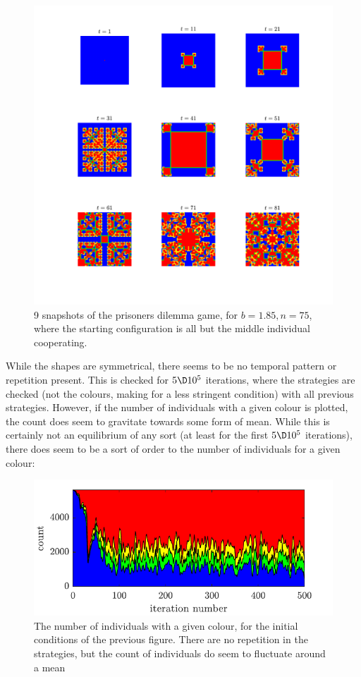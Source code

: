 \documentclass[a4paper,10pt]{article} 	%
\numberwithin{equation}{section}
\begin{document}
	\begin{figure}[H]
		\centering
		\includegraphics[width=\linewidth]{prisonersnapshot1}
		\caption{9 snapshots of the prisoners dilemma game, for $ b=1.85, n=75 $, where the starting configuration is all but the middle individual cooperating.}
		\label{fig:prisonersnap}
	\end{figure}
	
	While the shapes are symmetrical, there seems to be no temporal pattern or repetition present. This is checked for $ 5\D 10^5 $ iterations, where the strategies are checked (not the colours, making for a less stringent condition) with all previous strategies. However, if the number of individuals with a given colour is plotted, the count does seem to gravitate towards some form of mean. While this is certainly not an equilibrium of any sort (at least for the first $ 5\D 10^5 $ iterations), there does seem to be a sort of order to the number of individuals for a given colour:
	
	\begin{figure}[H]
		\centering
		\includegraphics[width = 0.75\linewidth]{prisonercount1}
		\caption{The number of individuals with a given colour, for the initial conditions of the previous figure. There are no repetition in the strategies, but the count of individuals do seem to fluctuate around a mean}
		\label{fig:prisonercount1}
	\end{figure}
\end{document}
